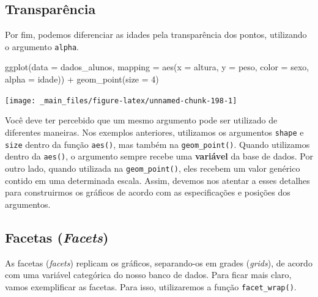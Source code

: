 \documentclass[
  brazilian,
]{book}
\newenvironment{Shaded}{\begin{snugshade}}{\end{snugshade}}
\newcommand{\AttributeTok}[1]{\textcolor[rgb]{0.77,0.63,0.00}{#1}}
\newcommand{\DecValTok}[1]{\textcolor[rgb]{0.00,0.00,0.81}{#1}}
\newcommand{\FunctionTok}[1]{\textcolor[rgb]{0.00,0.00,0.00}{#1}}
\newcommand{\NormalTok}[1]{#1}
\newcommand{\SpecialCharTok}[1]{\textcolor[rgb]{0.00,0.00,0.00}{#1}}
\begin{document}
\hypertarget{transparuxeancia}{%
\subsection{Transparência}\label{transparuxeancia}}

Por fim, podemos diferenciar as idades pela transparência dos pontos, utilizando o argumento \texttt{alpha}.

\begin{Shaded}
\begin{Highlighting}[]
\FunctionTok{ggplot}\NormalTok{(}\AttributeTok{data =}\NormalTok{ dados\_alunos,}
       \AttributeTok{mapping =} \FunctionTok{aes}\NormalTok{(}\AttributeTok{x =}\NormalTok{ altura,}
                     \AttributeTok{y =}\NormalTok{ peso,}
                     \AttributeTok{color =}\NormalTok{ sexo,}
                     \AttributeTok{alpha =}\NormalTok{ idade)) }\SpecialCharTok{+}
  \FunctionTok{geom\_point}\NormalTok{(}\AttributeTok{size =} \DecValTok{4}\NormalTok{)}
\end{Highlighting}
\end{Shaded}

\begin{center}\texttt{[image: \_main\_files/figure-latex/unnamed-chunk-198-1]} \end{center}

Você deve ter percebido que um mesmo argumento pode ser utilizado de diferentes maneiras. Nos exemplos anteriores, utilizamos os argumentos \texttt{shape} e \texttt{size} dentro da função \texttt{aes()}, mas também na \texttt{geom\_point()}. Quando utilizamos dentro da \texttt{aes()}, o argumento sempre recebe uma \textbf{variável} da base de dados. Por outro lado, quando utilizada na \texttt{geom\_point()}, eles recebem um valor genérico contido em uma determinada escala. Assim, devemos nos atentar a esses detalhes para construirmos os gráficos de acordo com as especificações e posições dos argumentos.

\hypertarget{facetas-facets}{%
\subsection{\texorpdfstring{Facetas (\emph{Facets})}{Facetas (Facets)}}\label{facetas-facets}}

As facetas (\emph{facets}) replicam os gráficos, separando-os em grades (\emph{grids}), de acordo com uma variável categórica do nosso banco de dados. Para ficar mais claro, vamos exemplificar as facetas. Para isso, utilizaremos a função \texttt{facet\_wrap()}.
\end{document}
